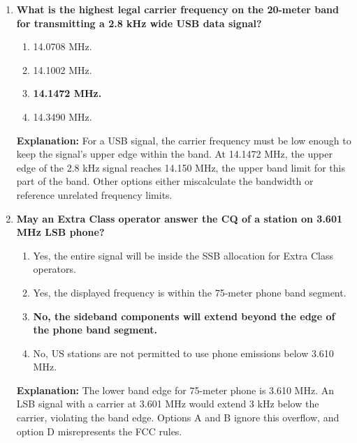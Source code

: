 \begin{enumerate}
    \item \textbf{What is the highest legal carrier frequency on the 20-meter band for transmitting a 2.8 kHz wide USB data signal?}
    \begin{enumerate}
        \item 14.0708 MHz.\\
        \item 14.1002 MHz.\\
        \item \textbf{14.1472 MHz.}\\
        \item 14.3490 MHz.
    \end{enumerate}
    \textbf{Explanation:} For a USB signal, the carrier frequency must be low enough to keep the signal's upper edge within the band. At 14.1472 MHz, the upper edge of the 2.8 kHz signal reaches 14.150 MHz, the upper band limit for this part of the band. Other options either miscalculate the bandwidth or reference unrelated frequency limits.

    \item \textbf{May an Extra Class operator answer the CQ of a station on 3.601 MHz LSB phone?}
    \begin{enumerate}
        \item Yes, the entire signal will be inside the SSB allocation for Extra Class operators.\\
        \item Yes, the displayed frequency is within the 75-meter phone band segment.\\
        \item \textbf{No, the sideband components will extend beyond the edge of the phone band segment.}\\
        \item No, US stations are not permitted to use phone emissions below 3.610 MHz.
    \end{enumerate}
    \textbf{Explanation:} The lower band edge for 75-meter phone is 3.610 MHz. An LSB signal with a carrier at 3.601 MHz would extend 3 kHz below the carrier, violating the band edge. Options A and B ignore this overflow, and option D misrepresents the FCC rules.


\end{enumerate}
